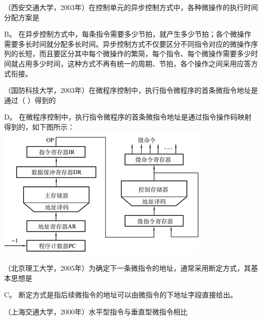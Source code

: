 \question （西安交通大学，2003年）在控制单元的异步控制方式中，各种微操作的执行时间分配方案是
\par{}
\begin{solution}B。
在异步控制方式中，每条指令需要多少节拍，就产生多少节拍；各个微操作需要多长时间就分配多长时间。异步控制方式不仅要区分不同指令对应的微操作序列的长短，而且要区分其中每个微操作的繁简，每个指令、每个微操作需要多少时间就占用多少时间，这种方式不再有统一的周期、节拍，各个操作之间采用应答方式衔接。
\end{solution}
\question （国防科技大学，2003年）在微程序控制中，执行指令微程序的首条微指令地址是通过（
）得到的
\par{}
\begin{solution}D。
在微程序控制中，执行指令微程序的首条微指令地址是通过指令操作码映射得到的，如下图所示：
\includegraphics[width=4.04167in,height=2.53125in]{computerassets/da09d1d834c7788c8e364a45a793ee25.jpeg}
\end{solution}
\question （北京理工大学，2005年）为确定下一条微指令的地址，通常采用断定方式，其基本思想是
\par{}
\begin{solution}C。 断定方式是指后续微指令的地址可以由微指令的下地址字段直接给出。
\end{solution}
\question （上海交通大学，2000年）水平型指令与垂直型微指令相比
\par{}
